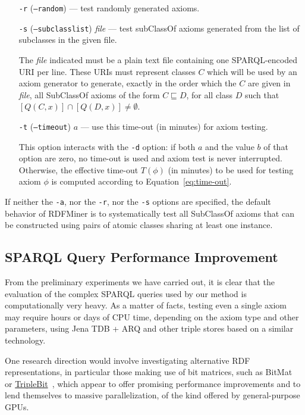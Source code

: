 \documentclass[a4paper]{article}
\newcounter{ex}
\begin{document}
\begin{enumerate}
\item[\texttt{-r}] (\texttt{--random}) --- test randomly generated axioms.

\item[\texttt{-s}] (\texttt{--subclasslist}) \emph{file} --- test \textsf{subClassOf} axioms
generated from the list of subclasses in the given file.

The \emph{file} indicated must be a plain text file containing one SPARQL-encoded URI per line.
These URIs must represent classes $C$ which will be used by an axiom generator to
generate, exactly in the order which the $C$ are given in \emph{file},
all \textsf{SubClassOf} axioms of the form $C \sqsubseteq D$, for all
class $D$ such that $[Q(C, x)] \cap [Q(D, x)] \neq \emptyset$.

\item[\texttt{-t}] (\texttt{--timeout}) $a$ --- use this time-out (in minutes) for axiom testing.

This option interacts with the \texttt{-d} option: if both $a$ and the value $b$ of that option
are zero, no time-out is used and axiom test is never interrupted. Otherwise, the
effective time-out $T(\phi)$ (in minutes) to be used for testing axiom $\phi$ is computed according
to Equation~\ref{eq:time-out}.

\end{enumerate}

If neither the \texttt{-a}, nor the \texttt{-r}, nor the \texttt{-s} options are specified,
the default behavior of RDFMiner is to systematically test all \textsf{SubClassOf} axioms
that can be constructed using pairs of atomic classes sharing at least one instance.


\subsection{SPARQL Query Performance Improvement}

From the preliminary experiments we have carried out, it is clear that the
evaluation of the complex SPARQL queries used by our method is computationally
very heavy. As a matter of facts, testing even a single axiom may require hours
or days of CPU time, depending on the axiom type and other parameters, using
Jena TDB + ARQ and other triple stores based on a similar technology.

One research direction would involve investigating alternative RDF representations,
in particular those making use of bit matrices, such as
BitMat~\cite{AtreSrinivasanHendler2008} or
\href{http://grid.hust.edu.cn/triplebit/}{TripleBit}~\cite{YuanLiuWuJinZhangLiu2013},
which appear to offer promising performance improvements and to lend themselves
to massive parallelization, of the kind offered by general-purpose GPUs.
\end{document}
